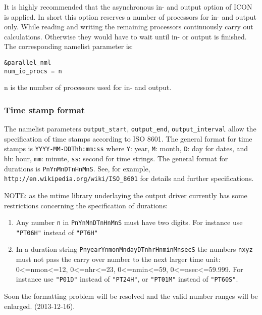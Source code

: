 It is highly recommended that the asynchronous in- and output option of ICON is applied. In short this option reserves a number of processors for in- and output only.  While reading and writing the remaining processors continuously carry out calculations. Otherwise they would have to wait until in- or output is finished. The corresponding namelist parameter is:

\begin{verbatim}
&parallel_nml
num_io_procs = n
\end{verbatim} 

n is the number of processors used for in- and output. 



\subsubsection{Time stamp format}


The namelist parameters \texttt{output\_start}, \texttt{output\_end}, \texttt{output\_interval} allow
the specification of time stamps according to ISO 8601.
The general format for time stamps is \texttt{YYYY-MM-DDThh:mm:ss}
where \texttt{Y}: year, \texttt{M}: month, \texttt{D}: day for dates, 
and   \texttt{hh}: hour, \texttt{mm}: minute, \texttt{ss}: second for time strings.  
The general format for durations is \texttt{PnYnMnDTnHnMnS}.
See, for example, \texttt{http://en.wikipedia.org/wiki/ISO\_8601} for details and further specifications.

\color{red}NOTE: as the mtime library underlaying the output driver
  currently has some restrictions concerning the specification of durations:\begin{enumerate}
\item Any number \texttt{n} in \texttt{PnYnMnDTnHnMnS} must have two digits. For instance use \texttt{"PT06H"} instead of \texttt{"PT6H"}
\item In a duration string \texttt{PnyearYnmonMndayDTnhrHnminMnsecS} the numbers \texttt{nxyz} must not pass the carry over number to the next larger time unit: 0<=nmon<=12, 0<=nhr<=23, 0<=nmin<=59, 0<=nsec<=59.999. For instance use \texttt{"P01D"} instead of \texttt{"PT24H"}, or \texttt{"PT01M"} instead of \texttt{"PT60S"}.
\end{enumerate}

Soon the formatting problem will be resolved and the valid number ranges will be enlarged.
(2013-12-16).\color{black}



